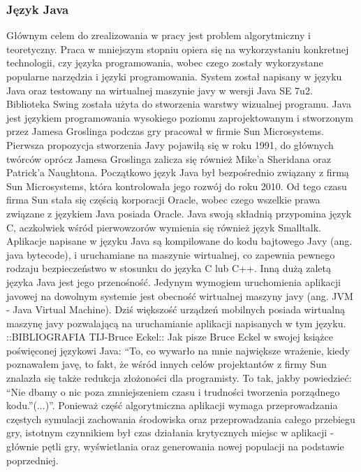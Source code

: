 \begin{par}
	\subsubsection{Język Java}
	Głównym celem do zrealizowania w pracy jest problem algorytmiczny i teoretyczny.
	Praca w mniejszym stopniu opiera się na wykorzystaniu konkretnej technologii, czy języka programowania, wobec czego zostały wykorzystane popularne narzędzia i języki programowania.
	System został napisany w języku Java oraz testowany na wirtualnej maszynie javy w wersji Java SE 7u2. Biblioteka Swing została użyta do stworzenia warstwy wizualnej programu.
	Java jest językiem programowania wysokiego poziomu zaprojektowanym i stworzonym przez Jamesa Groslinga podczas gry pracował w firmie Sun Microsystems. Pierwsza propozycja stworzenia Javy pojawiłą się w roku 1991, do głównych twórców oprócz Jamesa Groslinga zalicza się również Mike'a Sheridana oraz Patrick'a Naughtona.
	Początkowo język Java był bezpośrednio związany z firmą Sun Microsystems, która kontrolowała jego rozwój do roku 2010.
	Od tego czasu firma Sun stała się częścią korporacji Oracle, wobec czego wszelkie prawa związane z językiem Java posiada Oracle.
	Java swoją składnią przypomina język C, aczkolwiek wśród pierwowzorów wymienia się również język Smalltalk.
	Aplikacje napisane w języku Java są kompilowane do kodu bajtowego Javy (ang. java bytecode), i uruchamiane na maszynie wirtualnej, co zapewnia pewnego rodzaju bezpieczeństwo w stosunku do języka C lub C++.
	Inną dużą zaletą języka Java jest jego przenośność.
	Jedynym wymogiem uruchomienia aplikacji javowej na dowolnym systemie jest obecność wirtualnej maszyny javy (ang. JVM - Java Virtual Machine).
	Dziś większość urządzeń mobilnych posiada wirtualną maszynę javy pozwalającą na uruchamianie aplikacji napisanych w tym języku.
	::BIBLIOGRAFIA TIJ-Bruce Eckel::
	Jak pisze Bruce Eckel w swojej książce poświęconej językowi Java: ``To, co wywarło na mnie największe wrażenie, kiedy poznawałem javę, to fakt, że wśród innych celów projektantów z firmy Sun znalazła się także redukcja złożoności dla programisty. 
	To tak, jakby powiedzieć: ``Nie dbamy o nic poza zmniejszeniem czasu i trudności tworzenia porządnego kodu.''(...)''.
	Ponieważ część algorytmiczna aplikacji wymaga przeprowadzania częstych symulacji zachowania środowiska oraz przeprowadzania całego przebiegu gry, istotnym czynnikiem był czas działania krytycznych miejsc w aplikacji - głównie pętli gry, wyświetlania oraz generowania nowej populacji na podstawie poprzedniej.

\end{par}
